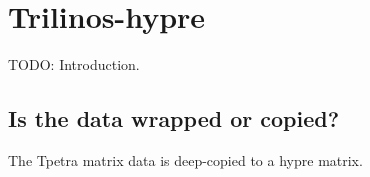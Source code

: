 \section{Trilinos-hypre}
{\color{red}TODO: Introduction.}





\subsection{Is the data wrapped or copied?}
The Tpetra matrix data is deep-copied to a hypre matrix.